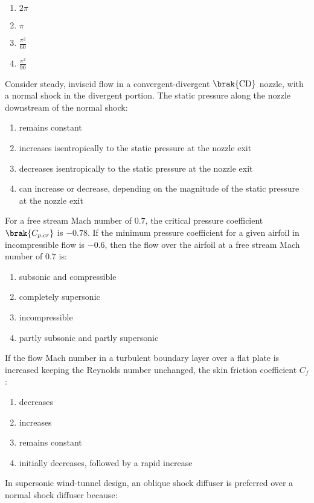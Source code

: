 \begin{enumerate}
    \item $2\pi$
    \item $\pi$
    \item $\frac{\pi^2}{60}$
    \item $\frac{\pi^2}{90}$
\end{enumerate}
\item Consider steady, inviscid flow in a convergent-divergent $\brak{\text{CD}}$ nozzle, with a normal shock in the divergent portion. The static pressure along the nozzle downstream of the normal shock:
\begin{enumerate}
    \item remains constant
    \item increases isentropically to the static pressure at the nozzle exit
    \item decreases isentropically to the static pressure at the nozzle exit
    \item can increase or decrease, depending on the magnitude of the static pressure at the nozzle exit
\end{enumerate}
\item For a free stream Mach number of $0.7$, the critical pressure coefficient $\brak{C_{p,cr}}$ is $-0.78$. If the minimum pressure coefficient for a given airfoil in incompressible flow is $-0.6$, then the flow over the airfoil at a free stream Mach number of $0.7$ is:
\begin{enumerate}
    \item subsonic and compressible
    \item completely supersonic
    \item incompressible
    \item partly subsonic and partly supersonic
\end{enumerate}
\item If the flow Mach number in a turbulent boundary layer over a flat plate is increased keeping the Reynolds number unchanged, the skin friction coefficient $C_f$:
\begin{enumerate}
    \item decreases
    \item increases
    \item remains constant
    \item initially decreases, followed by a rapid increase
\end{enumerate}
\item In supersonic wind-tunnel design, an oblique shock diffuser is preferred over a normal shock diffuser because:
